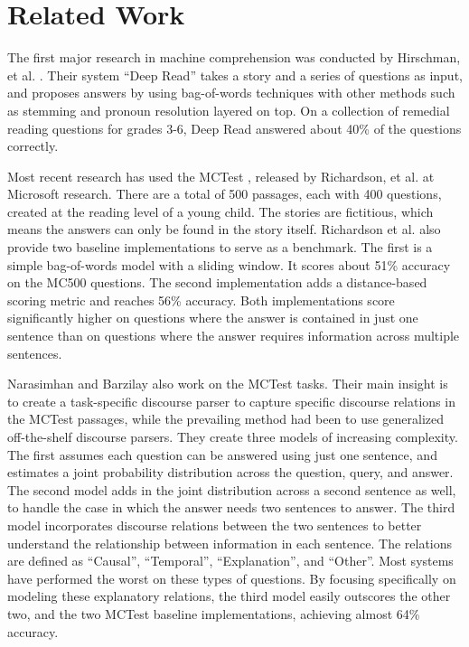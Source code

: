 \documentclass[pageno]{jpaper}
\begin{document}
\section{Related Work}
\label{Related Work}

The first major research in machine comprehension was conducted by Hirschman, et
al. \cite{Hirschman1999}. Their system ``Deep Read'' takes a story and a series
of questions as input, and proposes answers by using bag-of-words techniques
with other methods such as stemming and pronoun resolution layered on top. On a
collection of remedial reading questions for grades 3-6, Deep Read answered
about 40\% of the questions correctly.

Most recent research has used the MCTest \cite{Richardson2013}, released by
Richardson, et al. at Microsoft research. There are a total of 500 passages,
each with 400 questions, created at the reading level of a young child. The
stories are fictitious, which means the answers can only be found in the story
itself. Richardson et al. also provide two baseline implementations to serve as
a benchmark. The first is a simple bag-of-words model with a sliding window. It
scores about 51\% accuracy on the MC500 questions. The second implementation
adds a distance-based scoring metric and reaches 56\% accuracy. Both
implementations score significantly higher on questions where the answer is
contained in just one sentence than on questions where the answer requires
information across multiple sentences.

Narasimhan and Barzilay \cite{Narasimhan2015} also work on the MCTest tasks.
Their main insight is to create a task-specific discourse parser to capture
specific discourse relations in the MCTest passages, while the prevailing method
had been to use generalized off-the-shelf discourse parsers. They create three
models of increasing complexity. The first assumes each question can be answered
using just one sentence, and estimates a joint probability distribution across
the question, query, and answer. The second model adds in the joint distribution
across a second sentence as well, to handle the case in which the answer needs
two sentences to answer. The third model incorporates discourse relations
between the two sentences to better understand the relationship between
information in each sentence. The relations are defined as ``Causal'',
``Temporal'', ``Explanation'', and ``Other''. Most systems have performed the
worst on these types of questions. By focusing specifically on modeling these
explanatory relations, the third model easily outscores the other two, and the
two MCTest baseline implementations, achieving almost 64\% accuracy.
\end{document}
